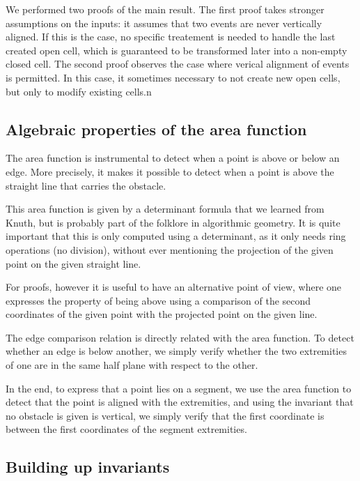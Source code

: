 \documentclass[a4paper, USenglish, cleveref, autoref, thm-restate]{lipics-v2021}
\begin{document}
We performed two proofs of the main result.  The first proof takes
stronger assumptions on the inputs: it assumes that two events are
never vertically aligned.  If this is the case, no specific treatement
is needed to handle the last created open cell, which is guaranteed to
be transformed later into a non-empty closed cell.  The second proof
observes the case where verical alignment of events is permitted.  In
this case, it sometimes necessary to not create new open cells, but
only to modify existing cells.n
\subsection{Algebraic properties of the area function}
The area function is instrumental to detect when a point is above or
below an edge.  More precisely, it makes it possible to detect when a
point is above the straight line that carries the obstacle.

This area function is given by a determinant formula that we learned
from Knuth, but is probably part of the folklore in algorithmic
geometry.  It is quite important that this is only computed using a
determinant, as it only needs ring operations (no division), without
ever mentioning the projection of the given point on the given
straight line.

For proofs, however it is useful to have an alternative point of view,
where one expresses the property of being above using a comparison of
the second coordinates of the given point with the projected point on
the given line.

The edge comparison relation is directly related with the area
function.  To detect whether an edge is below another, we simply
verify whether the two extremities of one are in the same half plane
with respect to the other.

In the end, to express that a point lies on a segment, we use the area
function to detect that the point is aligned with the extremities, and
using the invariant that no obstacle is given is vertical, we simply
verify that the first coordinate is between the first coordinates of
the segment extremities.
\subsection{Building up invariants}
\end{document}
